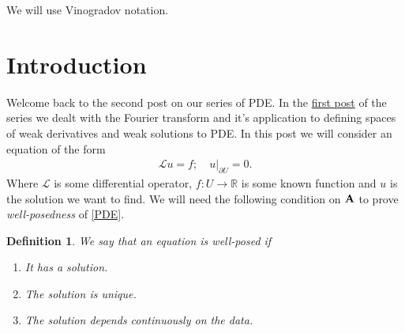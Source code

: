 \documentclass[
    a4paper,
    DIV=14,
    abstract=true,
    numbers=noenddot
]
{scrartcl}
\newtheorem{definition}[theorem]{Definition}
\theoremstyle{definition}
\newcommand\restr[2]{\left.#1\right|_{#2}}
\newcommand{\R}{\mathbb{R}}
\newcommand{\Ll}{\mathcal{L}}
\begin{document}
We will use Vinogradov notation.

\section{Introduction}
Welcome back to the second post on our series of PDE. In the \href{https://nowheredifferentiable.com/2023-01-29-PDE-1/}{first post} of the series we dealt with the Fourier transform and it's application to defining spaces of weak derivatives and weak solutions to PDE. In this post we will consider an equation of the form
\begin{align}\label{PDE}
    \Ll u =f; \quad \restr{u}{\partial U} =0.
\end{align}
Where $\Ll$ is some differential operator, $f: U \to  \R$  is some known function and $u$ is the solution we want to find. We will need the following condition on $\vb{A}$  to prove \emph{well-posedness} of \eqref{PDE}.
\begin{definition} We say that an equation is \emph{well-posed} if
    \begin{enumerate}
        \item It has a solution.
        \item The solution is unique.
        \item The solution depends continuously on the data.
    \end{enumerate}

\end{definition}
\end{document}
